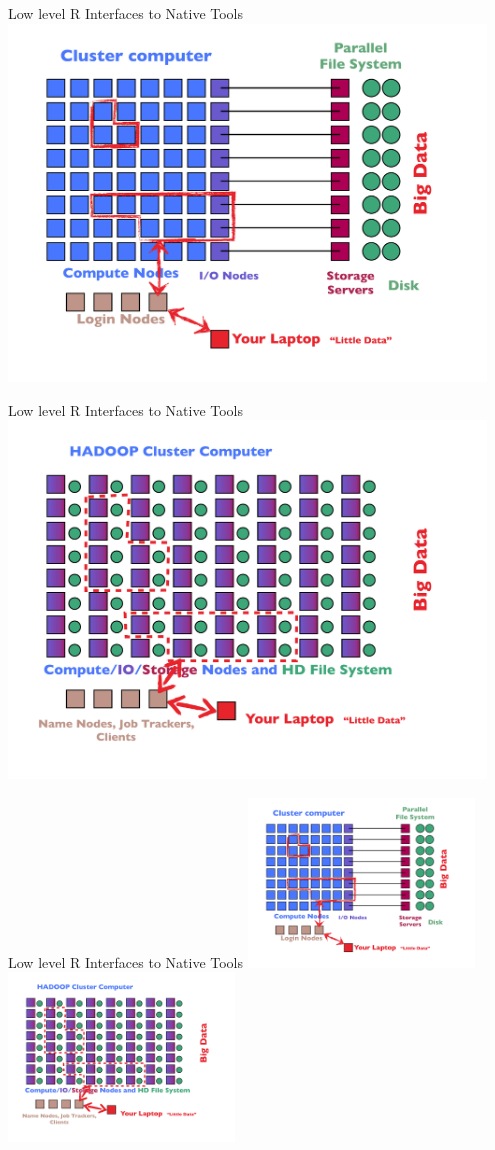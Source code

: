 \begin{frame}{Low level R Interfaces to Native Tools}
\includegraphics[width=0.95\textwidth]
{../common/pics/hardware/ParallelHardware22.pdf}
\end{frame}

\begin{frame}{Low level R Interfaces to Native Tools}
\includegraphics[width=0.95\textwidth]
{../common/pics/hardware/ParallelHardware23.pdf}
\end{frame}

\begin{frame}{Low level R Interfaces to Native Tools}
\includegraphics[width=0.45\textwidth]
{../common/pics/hardware/ParallelHardware22.pdf}
\includegraphics[width=0.45\textwidth]
{../common/pics/hardware/ParallelHardware23.pdf}
\end{frame}

